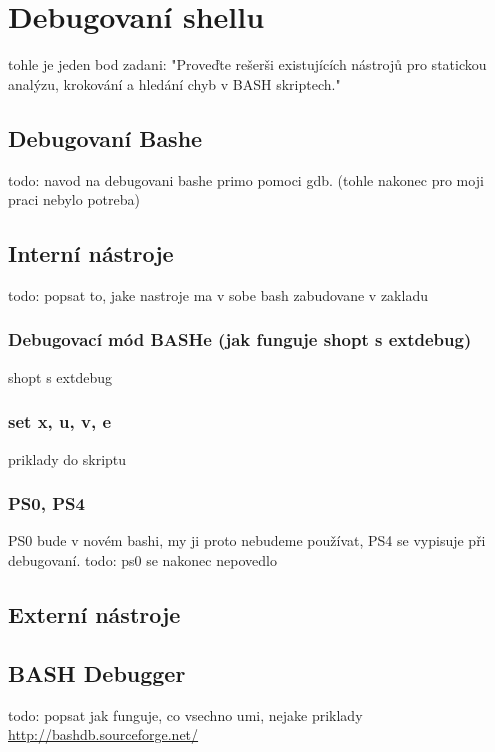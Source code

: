 \documentclass[thesis=M,czech]{FITthesis}[2012/06/26]
\begin{document}


\section{Debugovaní shellu} %

tohle je jeden bod zadani: "Proveďte rešerši existujících nástrojů pro statickou analýzu, krokování a hledání chyb v BASH skriptech."

\subsection{Debugovaní Bashe}
todo: navod na debugovani bashe primo pomoci gdb. (tohle nakonec pro moji praci nebylo potreba) 

\subsection{Interní nástroje}

todo: popsat to, jake nastroje ma v sobe bash zabudovane v zakladu

\subsubsection{Debugovací mód BASHe (jak funguje shopt s extdebug)}
shopt s extdebug

\subsubsection{set x, u, v, e}
priklady do skriptu

\subsubsection{PS0, PS4}
PS0 bude v novém bashi, my ji proto nebudeme používat, PS4 se vypisuje při debugovaní.
todo: ps0 se nakonec nepovedlo

\subsection{Externí nástroje}

\subsection{BASH Debugger}
todo: popsat jak funguje, co vsechno umi, nejake priklady
\url{http://bashdb.sourceforge.net/}
\end{document}
